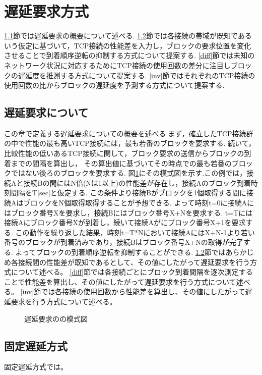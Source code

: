 \documentclass[a4j,12pt]{gradthesis_utf8}
\begin{document}
\section{遅延要求方式}
\ref{chienyokyu}節では遅延要求の概要について述べる.
\ref{kotei}節では各接続の帯域が既知であるいう仮定に基づいて，TCP接続の性能差を入力し，ブロックの要求位置を変化させることで到着順序逆転の抑制する方式について提案する.
\ref{diff}節では未知のネットワーク状況に対応するためにTCP接続の使用回数の差分に注目しブロックの遅延度を推測する方式について提案する.
\ref{inv}節ではそれぞれのTCP接続の使用回数の比からブロックの遅延度を予測する方式について提案する.

\subsection{遅延要求について}
\label{chienyokyu}
この章で定義する遅延要求についての概要を述べる.まず，確立したTCP接続群の中で性能の最も高いTCP接続には，最も若番のブロックを要求する.
続いて，比較性能の低いあるTCP接続に関して，ブロック要求の送信からブロックの到着までの間隔を算出し，
その算出値に基づいてその時点での最も若番のブロックではない後ろのブロックを要求する.
図\ref{delay}にその模式図を示す.この例では，接続Aと接続Bの間にはN倍(Nは1以上)の性能差が存在し，接続Aのブロック到着時刻間隔をT[sec]と仮定する.
この条件より接続Bがブロックを1個取得する間に接続AはブロックをN個取得取得することが予想できる.
よって時刻t=0に接続Aにはブロック番号Xを要求し，接続Bにはブロック番号X+Nを要求する.
t=Tには接続Aにブロック番号Xが到着し，続いて接続Aがにブロック番号X+1を要求する.
この動作を繰り返した結果，時刻t=T*Nにおいて接続AにはX+N-1より若い番号のブロックが到着済みであり，接続Bはブロック番号X+Nの取得が完了する.
よってブロックの到着順序逆転を抑制することができる.
\ref{kotei}節ではあらかじめ各接続間の性能差が既知であるとして、その値にしたがって遅延要求を行う方式について述べる。
\ref{diff}節では各接続ごとにブロック到着間隔を逐次測定することで性能差を算出し、その値にしたがって遅延要求を行う方式について述べる。
\ref{inv}節では各接続の使用回数から性能差を算出し、その値にしたがって遅延要求を行う方式について述べる。

 \begin{figure}[h]
	\centering
	\caption{遅延要求のの模式図}
	\label{delay}
\end{figure}

\subsection{固定遅延方式}
\label{kotei}
固定遅延方式では。
\end{document}
